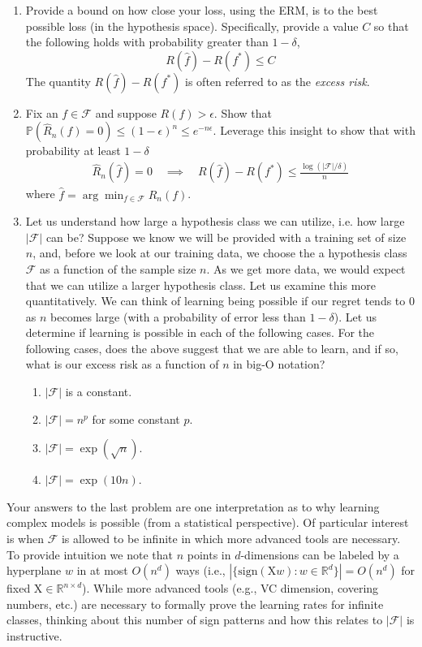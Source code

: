 \documentclass{article}
\newcommand{\field}[1]{\mathbb{#1}}
\newcommand{\1}{\mathbf{1}}
\renewcommand{\P}{\mathbb{P}} %
\newcommand{\R}{\field{R}} %
\begin{document}
\begin{enumerate}
\item Provide a bound on how close your loss, using the ERM, is
  to the best possible loss (in the hypothesis space). 
  Specifically, provide a value $C$ so that the following holds with probability greater than $1-\delta$,
  \[
  R(\widehat f) - R(f^*) \leq C
  \]
  The quantity $R(\widehat f) - R(f^*)$ is often referred to as the \emph{excess risk}.

\item Fix an $f \in \mathcal{F}$ and suppose $R(f) > \epsilon$. 
Show that $\P( \widehat{R}_n(f) = 0 ) \leq (1-\epsilon)^n \leq e^{-n \epsilon}$.
Leverage this insight to show that with probability at least $1-\delta$ 
\begin{align*}
\widehat{R}_n(\widehat{f})=0 \quad \implies \quad  R(\widehat f) - R(f^*) \leq \frac{\log(|\mathcal{F}|/\delta)}{n}
\end{align*}
where $\widehat f = \arg\min_{f\in\mathcal{F}} \widehat R_n(f)$. 

\item Let us understand how large a hypothesis class we can utilize,
  i.e. how large $|\mathcal{F}|$ can be? Suppose we know we will be provided with a training set of
  size $n$, and, before we look at our training data, we choose the
  a hypothesis class $\mathcal{F}$ as a function of the sample size $n$. As we get
  more data, we would expect that we can utilize a larger hypothesis
  class. Let us examine this more quantitatively. We can think of
  learning being possible if our regret tends to $0$ as $n$ becomes
  large (with a probability of error less than  $1-\delta$). Let us determine if learning is possible in each of the
  following cases. For the following cases, does the above suggest that we are able to learn, and if so, what is our excess risk as a function of $n$ in big-O notation?
\begin{enumerate}
\item $|\mathcal{F}|$ is a constant.\\
\item $|\mathcal{F}|=n^p$ for some constant $p$.\\
\item $|\mathcal{F}|=\exp(\sqrt{n})$.\\
\item $|\mathcal{F}|=\exp(10 n)$. \\
\end{enumerate}
\end{enumerate}
Your answers to the last problem are one interpretation as to why learning
complex models is possible (from a statistical perspective). 
Of particular interest is when $\mathcal{F}$ is allowed to be infinite in which more advanced tools are necessary. 
To provide intuition we note that $n$ points in $d$-dimensions can be labeled by a hyperplane $w$ in at most $O(n^d)$ ways (i.e., $|\{ \text{sign}(\mathrm{X} w) : w \in \R^d \}| = O(n^d)$ for fixed $\mathrm{X} \in \R^{n \times d}$).
While more advanced tools (e.g., VC dimension, covering numbers, etc.) are necessary to formally prove the learning rates for infinite classes, thinking about this number of sign patterns and how this relates to $|\mathcal{F}|$ is instructive.
\end{document}
